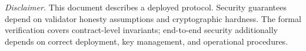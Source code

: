 \vspace{1em}
\noindent\textit{Disclaimer.} This document describes a deployed protocol. Security guarantees depend on validator honesty assumptions and cryptographic hardness. The formal verification covers contract-level invariants; end-to-end security additionally depends on correct deployment, key management, and operational procedures.

